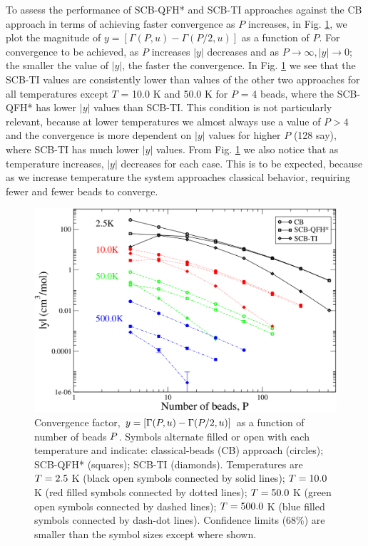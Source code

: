     To assess the performance of SCB-QFH* and SCB-TI approaches against the CB approach in terms of achieving faster convergence as $P$ increases, in Fig. \ref{shMag}, we plot the magnitude of $y = [\Gamma(P,u) - \Gamma(P/2,u)]$ as a function of $P$. For convergence to be achieved, as $P$ increases $|y|$ decreases and as $P \to \infty, |y| \to 0$; the smaller the value of $|y|$, the faster the convergence. In Fig. \ref{shMag} we see that the SCB-TI values are consistently lower than values of the other two approaches for all temperatures except $T$ = 10.0 K and 50.0 K for $P$ = 4 beads, where the SCB-QFH* has lower $|y|$ values than SCB-TI. This condition is not particularly relevant, because at lower temperatures we almost always use a value of $P > 4$ and the convergence is more dependent on $|y|$ values for higher $P$ (128 say), where SCB-TI has much lower $|y|$ values. From Fig. \ref{shMag} we also notice that as temperature increases, $|y|$ decreases for each case. This is to be expected, because as we increase temperature the system approaches classical behavior, requiring fewer and fewer beads to converge.
    \begin{figure}
        \centering
        \includegraphics[scale=0.3,keepaspectratio]{Chapter-3/Figures/shMagVsP.png}
        \caption{Convergence factor, $\protect y = [\Gamma(P,u) - \Gamma(P/2,u)]$ as a function of number of beads $\protect P$. Symbols alternate filled or open with each temperature and indicate: classical-beads (CB) approach (circles); SCB-QFH* (squares); SCB-TI (diamonds). Temperatures are $\protect T = 2.5~$K (black open symbols connected by solid lines); $\protect T = 10.0~$K (red filled symbols connected by dotted lines); $\protect T = 50.0~$K (green open symbols connected by dashed lines); $\protect T = 500.0~$K (blue filled symbols connected by dash-dot lines). Confidence limits (68\%) are smaller than the symbol sizes except where shown.} \label{shMag}
    \end{figure}

